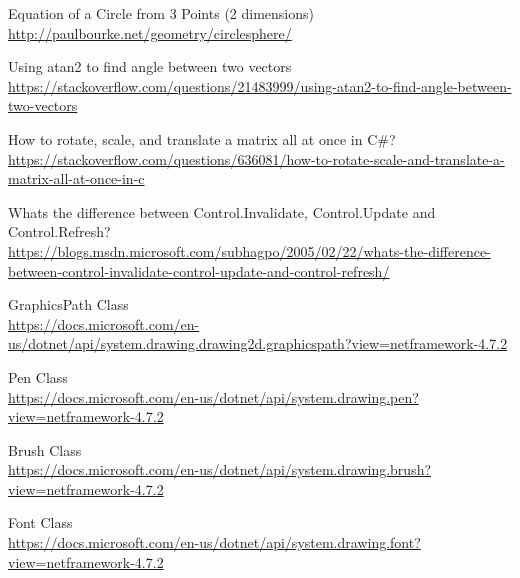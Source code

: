 \documentclass[12pt]{article}
\begin{document}
\begin{thebibliography}{9}
 Equation of a Circle from 3 Points (2 dimensions) \\
\url{http://paulbourke.net/geometry/circlesphere/}

 Using atan2 to find angle between two vectors \\
\url{https://stackoverflow.com/questions/21483999/using-atan2-to-find-angle-between-two-vectors}

 How to rotate, scale, and translate a matrix all at once in C\#? \\
\url{https://stackoverflow.com/questions/636081/how-to-rotate-scale-and-translate-a-matrix-all-at-once-in-c}

 Whats the difference between Control.Invalidate, Control.Update and Control.Refresh? \\
\url{https://blogs.msdn.microsoft.com/subhagpo/2005/02/22/whats-the-difference-between-control-invalidate-control-update-and-control-refresh/}

 GraphicsPath Class \\
\url{https://docs.microsoft.com/en-us/dotnet/api/system.drawing.drawing2d.graphicspath?view=netframework-4.7.2}

 Pen Class \\
\url{https://docs.microsoft.com/en-us/dotnet/api/system.drawing.pen?view=netframework-4.7.2}

 Brush Class \\
\url{https://docs.microsoft.com/en-us/dotnet/api/system.drawing.brush?view=netframework-4.7.2}

 Font Class \\
\url{https://docs.microsoft.com/en-us/dotnet/api/system.drawing.font?view=netframework-4.7.2}

\end{thebibliography}
\end{document}
